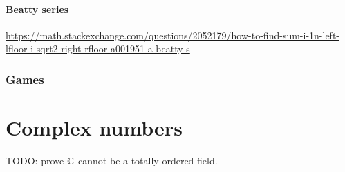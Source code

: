 \subsubsection{Beatty series}
\url{https://math.stackexchange.com/questions/2052179/how-to-find-sum-i-1n-left-lfloor-i-sqrt2-right-rfloor-a001951-a-beatty-s}


\subsection{Games}

\chapter{Complex numbers}
TODO: prove $\mathbb{C}$ cannot be a totally ordered field.
